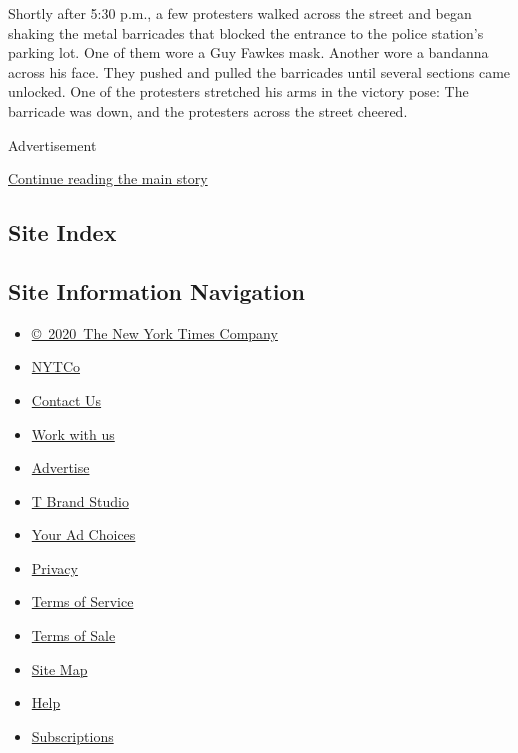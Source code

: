 Shortly after 5:30 p.m., a few protesters walked across the street and
began shaking the metal barricades that blocked the entrance to the
police station's parking lot. One of them wore a Guy Fawkes mask.
Another wore a bandanna across his face. They pushed and pulled the
barricades until several sections came unlocked. One of the protesters
stretched his arms in the victory pose: The barricade was down, and the
protesters across the street cheered.

Advertisement

\protect\hyperlink{after-bottom}{Continue reading the main story}

\hypertarget{site-index}{%
\subsection{Site Index}\label{site-index}}

\hypertarget{site-information-navigation}{%
\subsection{Site Information
Navigation}\label{site-information-navigation}}

\begin{itemize}
\tightlist
\item
  \href{https://help.nytimes.com/hc/en-us/articles/115014792127-Copyright-notice}{©~2020~The
  New York Times Company}
\end{itemize}

\begin{itemize}
\tightlist
\item
  \href{https://www.nytco.com/}{NYTCo}
\item
  \href{https://help.nytimes.com/hc/en-us/articles/115015385887-Contact-Us}{Contact
  Us}
\item
  \href{https://www.nytco.com/careers/}{Work with us}
\item
  \href{https://nytmediakit.com/}{Advertise}
\item
  \href{http://www.tbrandstudio.com/}{T Brand Studio}
\item
  \href{https://www.nytimes.com/privacy/cookie-policy\#how-do-i-manage-trackers}{Your
  Ad Choices}
\item
  \href{https://www.nytimes.com/privacy}{Privacy}
\item
  \href{https://help.nytimes.com/hc/en-us/articles/115014893428-Terms-of-service}{Terms
  of Service}
\item
  \href{https://help.nytimes.com/hc/en-us/articles/115014893968-Terms-of-sale}{Terms
  of Sale}
\item
  \href{https://spiderbites.nytimes.com}{Site Map}
\item
  \href{https://help.nytimes.com/hc/en-us}{Help}
\item
  \href{https://www.nytimes.com/subscription?campaignId=37WXW}{Subscriptions}
\end{itemize}

